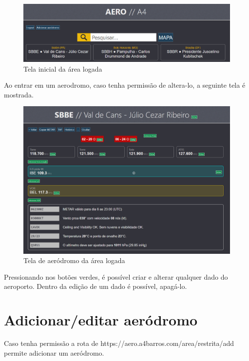 \begin{figure}[ht]
    \begin{center}
    \includegraphics[width=\linewidth]{img/area-restrita-root.png}
    \caption{Tela inicial da área logada}
    \label{fig:max-priv-sys}
    \end{center}
\end{figure}

Ao entrar em um aerodromo, caso tenha permissão de altera-lo, a seguinte tela
é mostrada.

\begin{figure}[ht]
    \begin{center}
    \includegraphics[width=\linewidth]{img/admin-root.png}
    \caption{Tela de aeródromo da área logada}
    \label{fig:max-priv-sys}
    \end{center}
\end{figure}

Pressionando nos botões verdes, é possível criar e alterar qualquer dado do
aeroporto. Dentro da edição de um dado é possível, apagá-lo.

\section {Adicionar/editar aeródromo}
Caso tenha permissão a rota de
https://aero.a4barros.com/area/restrita/add permite adicionar um aeródromo. 

